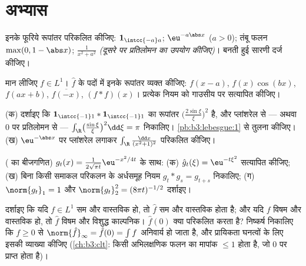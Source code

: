 \section{अभ्यास}

\begin{exercise}[$\star$]\label{exo:b3:fouriertransform:1}
इनके फूरिये रूपांतर परिकलित कीजिए: $\mathbf 1_{\intcc{-a}a}$; $\eu^{-a\abs x}$ ($a > 0$); तंबू फलन
$\max(0, 1 -
\abs x)$; $\frac1{x^2 + a^2}$ \emph{(दूसरे पर प्रतिलोमन का उपयोग कीजिए)}। बनती हुई
सारणी दर्ज कीजिए।
\end{exercise}

\begin{exercise}[$\star$]\label{exo:b3:fouriertransform:2}
मान लीजिए $f \in L^1$। $\hat f$ के पदों में इनके रूपांतर व्यक्त कीजिए:
$f(x - a)$, $f(x)\cos(bx)$, $f(ax + b)$, $\overline{f(-x)}$, $(f * f)(x)$। प्रत्येक नियम को गाउसीय पर
सत्यापित कीजिए।
\end{exercise}

\begin{exercise}[$\star\star$]\label{exo:b3:fouriertransform:3}
(क) दर्शाइए कि $\mathbf 1_{\intcc{-1}1} * \mathbf
1_{\intcc{-1}1}$ का रूपांतर $\bigl(\frac{2\sin\xi}\xi
\bigr)^2$ है, और प्लांशरेल से ---
अथवा $0$ पर प्रतिलोमन से --- $\int_\R\bigl(\frac{\sin\xi}\xi\bigr)^2\dd\xi = \pi$ निकालिए। \cref{pb:b3:lebesgue:1} से तुलना
कीजिए।
(ख) $\eu^{-\abs x}$ पर प्लांशरेल लगाकर $\int_\R\frac{\dd x}{(x^2+1)^2}$ परिकलित कीजिए।
\end{exercise}

\begin{exercise}[$\star\star$]\label{exo:b3:fouriertransform:4}
( का बीजगणित) $g_t(x) =
\frac1{2\sqrt{\pi t}}\eu^{-x^2/4t}$ के साथ:
(क) $\hat g_t(\xi) = \eu^{-t\xi^2}$ सत्यापित कीजिए;
(ख) बिना किसी समाकल परिकलन के अर्धसमूह नियम $g_t * g_s = g_{t+s}$ निकालिए;
(ग) $\norm{g_t}_1 = 1$ और $\norm{g_t}_2^2 =
(8\pi t)^{-1/2}$ दर्शाइए।
\end{exercise}

\begin{exercise}[$\star\star$]\label{exo:b3:fouriertransform:5}
दर्शाइए कि यदि $f \in L^1$ सम और वास्तविक हो, तो $\hat f$ सम और वास्तविक
होता है; और यदि $f$ विषम और वास्तविक हो, तो $\hat f$ विषम और
विशुद्ध काल्पनिक। $\hat f(0)$ क्या परिकलित करता है? निष्कर्ष निकालिए कि
$f \geq
0$ से $\norm{\hat f}_\infty = \hat f(0) = \int f$ अनिवार्य हो जाता है, और प्रायिकता घनत्वों के लिए
इसकी व्याख्या कीजिए (\cref{ch:b3:clt}: किसी अभिलक्षणिक फलन का मापांक $\leq 1$
होता है, जो $0$ पर प्राप्त होता है)।
\end{exercise}


